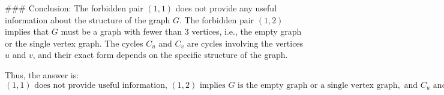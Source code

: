 ### Conclusion:
The forbidden pair \((1,1)\) does not provide any useful information about the structure of the graph \(G\). The forbidden pair \((1,2)\) implies that \(G\) must be a graph with fewer than 3 vertices, i.e., the empty graph or the single vertex graph. The cycles \(C_u\) and \(C_v\) are cycles involving the vertices \(u\) and \(v\), and their exact form depends on the specific structure of the graph.

Thus, the answer is:
\[
\boxed{(1,1) \text{ does not provide useful information, } (1,2) \text{ implies } G \text{ is the empty graph or a single vertex graph}, \text{ and } C_u \text{ and } C_v \text{ are cycles involving } u \text{ and } v}
\]